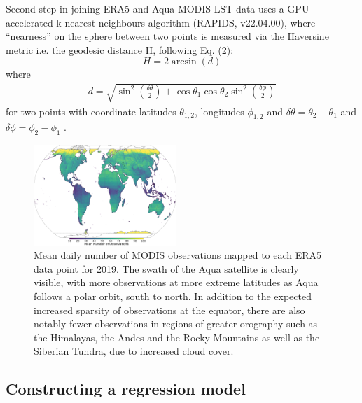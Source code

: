 \documentclass[hess, manuscript]{copernicus}
\begin{document}
Second step in joining ERA5 and Aqua-MODIS LST data uses a GPU-accelerated k-nearest neighbours algorithm (RAPIDS, v22.04.00), where “nearness” on the sphere between two points is measured via the Haversine metric i.e. the geodesic distance H, following Eq. (2):
\begin{equation}
	H = 2 \arcsin (d)
\end{equation}
where
\begin{eqnarray}
	d = \sqrt{\sin^2\left(\frac{\delta\theta}{2}\right) + \cos \theta_1 \cos \theta_2 \sin^2\left(\frac{\delta \phi}{2}\right) }
\end{eqnarray} 
for two points with coordinate latitudes $\theta_{1,2}$, longitudes $\phi_{1,2}$ and $\delta \theta = \theta_2 - \theta_1$ and  $\delta \phi = \phi_2 - \phi_1$ . 
\begin{figure}
	\includegraphics[width=0.48\textwidth]{num_obs_map.png}
	\caption{Mean daily number of MODIS observations mapped to each ERA5 data point for 2019. The swath of the Aqua satellite is clearly visible, with more observations at more extreme latitudes as Aqua follows a polar orbit, south to north. In addition to the expected increased sparsity of observations at the equator, there are also notably fewer observations in regions of greater orography such as the Himalayas, the Andes and the  Rocky Mountains as well as the Siberian Tundra, due to increased cloud cover.} 
	\label{fig:MODIS_obs}
\end{figure}

\subsection{Constructing a regression model}
\end{document}

